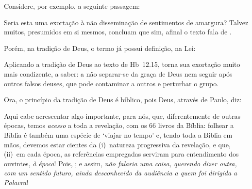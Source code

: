     Considere, por exemplo, a seguinte passagem:


    Seria esta uma exortação à não disseminação de sentimentos de amargura? Talvez muitos, presumidos em si mesmos, concluam que
    sim, afinal o texto fala de .

    Porém, na tradição de Deus, o termo já possui definição, na Lei:


    Aplicando a tradição de Deus ao texto de Hb~12.15, torna sua exortação muito mais condizente, a saber: a não separar-se da
    graça de Deus nem seguir após outros falsos deuses, que pode contaminar a outros e perturbar o grupo.

    Ora, o princípio da tradição de Deus é bíblico, pois Deus, através de Paulo, diz:


    Aqui cabe acrescentar algo importante, para nós, que,  diferentemente  de  outras  épocas,  temos  \emph{acesso}  a  toda  a
    revelação, com os 66 livros da Bíblia: folhear a Bíblia é também uma espécie de `viajar no tempo' e, tendo toda a Bíblia  em
    mãos, devemos estar cientes da (i)~natureza progressiva da revelação, e que, (ii)~em cada época, as  referências  empregadas
    serviram  para  entendimento  dos  ouvintes,  \emph{à  época}!  Pois,  ; e assim, \emph{não falaria uma coisa, querendo dizer outra, com um  sentido  futuro,  ainda
    desconhecido da audiência a quem foi dirigida a Palavra}!
    


